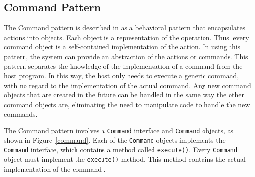 \subsection{Command Pattern}

The Command pattern is described in \cite{GangOf4} as a behavioral pattern that 
encapsulates actions into objects. Each object is a representation of the 
operation. Thus, every command object is a self-contained implementation of the
action. In using this pattern, the system can provide an abstraction of the 
actions or commands. This pattern separates the knowledge of the implementation
of a command from the host program. In this way, the host only needs to execute
a generic command, with no regard to the implementation of the actual command. 
Any new command objects that are created in the future can be handled in the 
same way the other command objects are, eliminating the need to manipulate code
to handle the new commands.

The Command pattern involves a \texttt{Command} interface and \texttt{Command} 
objects, as shown in Figure~\ref{command}. Each of the \texttt{Command} objects
implements the \texttt{Command} interface, which contains a method called 
\texttt{execute()}. Every \texttt{Command} object must implement the 
\texttt{execute()} method. This method contains the actual implementation of the
command \cite{GangOf4}. 

